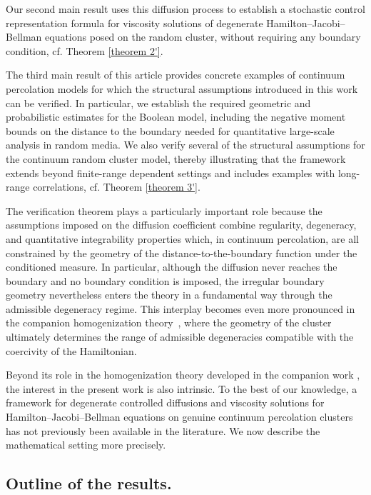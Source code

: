 \documentclass[11pt]{article}
\theoremstyle{rem}
\begin{document}
Our second main result uses this diffusion process to establish a stochastic control representation formula for viscosity solutions of degenerate Hamilton--Jacobi--Bellman equations posed on the random cluster, without requiring any boundary condition, cf. Theorem \ref{theorem 2'}.

The third main result of this article provides concrete examples of continuum percolation models for
which the structural assumptions introduced in this work can be verified. In particular, we establish
the required geometric and probabilistic estimates for the Boolean model, including the negative
moment bounds on the distance to the boundary needed for quantitative large-scale analysis in random
media. We also verify several of the structural assumptions for the continuum random cluster model,
thereby illustrating that the framework extends beyond finite-range dependent settings and includes
examples with long-range correlations, cf. Theorem \ref{theorem 3'}.

The verification theorem plays a particularly important role because the
assumptions imposed on the diffusion coefficient combine regularity,
degeneracy, and quantitative integrability properties which, in continuum
percolation, are all constrained by the geometry of the
distance-to-the-boundary function under the conditioned measure. In
particular, although the diffusion never reaches the boundary and no boundary
condition is imposed, the irregular boundary geometry nevertheless enters the
theory in a fundamental way through the admissible degeneracy regime. This
interplay becomes even more pronounced in the companion homogenization
theory~\cite{BMM26}, where the geometry of the cluster ultimately determines
the range of admissible degeneracies compatible with the coercivity of the
Hamiltonian.

Beyond its role in the homogenization theory developed in the companion work
\cite{BMM26}, the interest in the present work is also intrinsic. To the best
of our knowledge, a framework for degenerate controlled diffusions
and viscosity solutions for Hamilton--Jacobi--Bellman equations on genuine
continuum percolation clusters has not previously been available in the
literature. We now describe the mathematical setting more precisely.





\subsection{Outline of the results.}\label{subsec outline}
\end{document}
